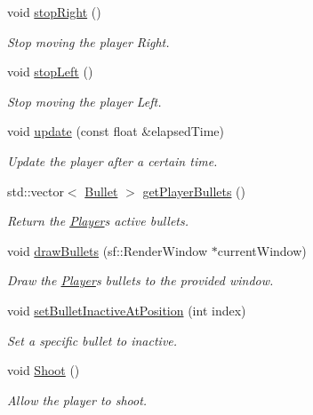 \begin{DoxyCompactItemize}
void \hyperlink{class_player_afebb6b7ca7210e7b1aa2c9ee4ff75b0e}{stop\+Right} ()
\begin{DoxyCompactList}\small\item\em Stop moving the player Right. \end{DoxyCompactList}\item 
void \hyperlink{class_player_aa150f941486096bb63cc67eabec9046c}{stop\+Left} ()
\begin{DoxyCompactList}\small\item\em Stop moving the player Left. \end{DoxyCompactList}\item 
void \hyperlink{class_player_aaccee569406f6180bd5028d058b8579f}{update} (const float \&elapsed\+Time)
\begin{DoxyCompactList}\small\item\em Update the player after a certain time. \end{DoxyCompactList}\item 
std\+::vector$<$ \hyperlink{class_bullet}{Bullet} $>$ \hyperlink{class_player_a39c13745f2cd7f6c17be23965b08dfac}{get\+Player\+Bullets} ()
\begin{DoxyCompactList}\small\item\em Return the \hyperlink{class_player}{Player}\textquotesingle{}s active bullets. \end{DoxyCompactList}\item 
void \hyperlink{class_player_aa75798d0eaf3066acc57f6cb3158f0bb}{draw\+Bullets} (sf\+::\+Render\+Window $\ast$current\+Window)
\begin{DoxyCompactList}\small\item\em Draw the \hyperlink{class_player}{Player}\textquotesingle{}s bullets to the provided window. \end{DoxyCompactList}\item 
void \hyperlink{class_player_a4a72b5ba696e55375ee614ef89a87ade}{set\+Bullet\+Inactive\+At\+Position} (int index)
\begin{DoxyCompactList}\small\item\em Set a specific bullet to inactive. \end{DoxyCompactList}\item 
void \hyperlink{class_player_a2105394431517a41d38140cb65982331}{Shoot} ()
\begin{DoxyCompactList}\small\item\em Allow the player to shoot. \end{DoxyCompactList}\item 

\end{DoxyCompactItemize}
